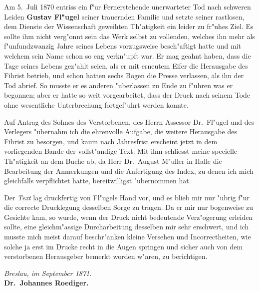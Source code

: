 \documentclass[11pt,a4paper]{article}
\newenvironment{german}{\germanfont}{}
\begin{document}
\begin{german}

Am 5.~Juli 1870 entriss ein f"ur Fernerstehende unerwarteter Tod nach
schweren Leiden \textbf{Gustav Fl"ugel} seiner trauernden Familie und setzte
seiner rastlosen, dem Dienste der Wissenschaft geweihten Th"atigkeit ein
leider zu fr"uhes Ziel. Es sollte ihm nicht verg"onnt sein das Werk selbst
zu vollenden, welches ihn mehr als f"unfundzwanzig Jahre seines Lebens
vorzugsweise besch"aftigt hatte und mit welchem sein Name schon so eng
verkn"upft war. Er mag geahnt haben, dass die Tage seines Lebens gez"ahlt
seien, als er mit erneutem Eifer die Herausgabe des Fihrist betrieb, und
schon hatten sechs Bogen die Presse verlassen, als ihn der Tod abrief.
So musste er es anderen "uberlassen zu Ende zu f"uhren was er begonnen;
aber er hatte so weit vorgearbeitet, dass der Druck nach seinem Tode ohne
wesentliche Unterbrechung fortgef"uhrt werden konnte.

\smallskip

Auf Antrag des Sohnes des Verstorbenen, des Herrn Assessor Dr.~Fl"ugel
und des Verlegers "ubernahm ich die ehrenvolle Aufgabe, die weitere
Herausgabe des Fihrist zu besorgen, und kaum nach Jahresfrist erscheint
jetzt in dem vorliegenden Bande der vollst"andige Text. Mit ihm
schliesst meine specielle Th"atigkeit an dem Buche ab, da Herr
Dr.~August M"uller in Halle die Bearbeitung der Anmerkungen und die
Anfertigung des Index, zu denen ich mich gleichfalls verpflichtet hatte,
bereitwilligst "ubernommen hat.

\smallskip

Der \textit{Text} lag druckfertig von Fl"ugels Hand vor, und es blieb mir nur
"ubrig f"ur die correcte Drucklegung desselben Sorge zu tragen. Da er
mir nur bogenweise zu Gesichte kam, so wurde, wenn der Druck nicht
bedeutende Verz"ogerung erleiden sollte, eine gleichm"assige
Durcharbeitung desselben mir sehr erschwert, und ich musste mich meist
darauf beschr"anken kleine Versehen und Incorrectheiten, wie solche ja
erst im Drucke recht in die Augen springen und sicher auch von dem
verstorbenen Herausgeber bemerkt worden w"aren, zu berichtigen.

\end{german}

\vspace{1em}
\begin{flushright}
\textit{Breslau, im September 1871.}\\[0.3em]
\textbf{Dr.~Johannes Roediger.}
\end{flushright}
\end{document}
